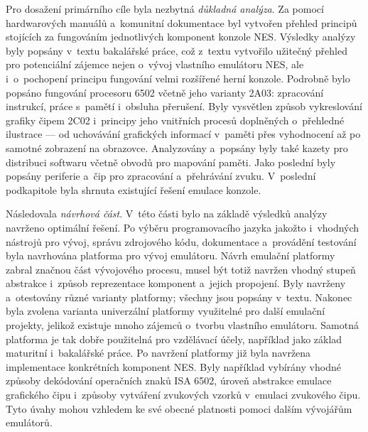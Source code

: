 Pro dosažení primárního cíle byla nezbytná \emph{důkladná analýza}. Za pomocí hardwarových manuálů a~komunitní dokumentace byl vytvořen přehled principů stojících za fungováním jednotlivých komponent konzole NES. Výsledky analýzy byly popsány v~textu bakalářské práce, což z~textu vytvořilo užitečný přehled pro potenciální zájemce nejen o~vývoj vlastního emulátoru NES, ale i~o~pochopení principu fungování velmi rozšířené herní konzole. Podrobně bylo popsáno fungování procesoru 6502 včetně jeho varianty 2A03: zpracování instrukcí, práce s~pamětí i~obsluha přerušení. Byly vysvětlen způsob vykreslování grafiky čipem 2C02 i~principy jeho vnitřních procesů doplněných o~přehledné ilustrace --- od uchovávání grafických informací v~paměti přes vyhodnocení až po samotné zobrazení na obrazovce. Analyzovány a~popsány byly také kazety pro distribuci softwaru včetně obvodů pro mapování paměti. Jako poslední byly popsány periferie a~čip pro zpracování a~přehrávání zvuku. V~poslední podkapitole byla shrnuta existující řešení emulace konzole. 

Následovala \emph{návrhová část}. V~této části bylo na základě výsledků analýzy navrženo optimální řešení. Po výběru programovacího jazyka jakožto i~vhodných nástrojů pro vývoj, správu zdrojového kódu, dokumentace a~provádění testování byla navrhována platforma pro vývoj emulátoru. Návrh emulační platformy zabral značnou část vývojového procesu, musel být totiž navržen vhodný stupeň abstrakce i~způsob reprezentace komponent a~jejich propojení. Byly navrženy a~otestovány různé varianty platformy; všechny jsou popsány v~textu. Nakonec byla zvolena varianta univerzální platformy využitelné pro další emulační projekty, jelikož existuje mnoho zájemců o~tvorbu vlastního emulátoru. Samotná platforma je tak dobře použitelná pro vzdělávací účely, například jako základ maturitní i~bakalářské práce. Po navržení platformy již byla navržena implementace konkrétních komponent NES. Byly například vybírány vhodné způsoby dekódování operačních znaků ISA 6502, úroveň abstrakce emulace grafického čipu i~způsoby vytváření zvukových vzorků v~emulaci zvukového čipu. Tyto úvahy mohou vzhledem ke své obecné platnosti pomoci dalším vývojářům emulátorů.

